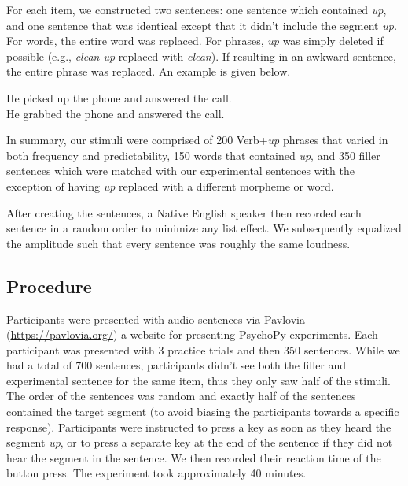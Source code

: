 \documentclass[
  man,floatsintext]{apa6}
\begin{document}
For each item, we constructed two sentences: one sentence which contained \emph{up}, and one sentence that was identical except that it didn't include the segment \emph{up.} For words, the entire word was replaced. For phrases, \emph{up} was simply deleted if possible (e.g., \emph{clean up} replaced with \emph{clean}). If resulting in an awkward sentence, the entire phrase was replaced. An example is given below.

\begin{exe} 
\ex
  \begin{xlist}
    \ex He picked up the phone and answered the call. \\
    \ex He grabbed the phone and answered the call. \\
  \end{xlist}
\end{exe}

In summary, our stimuli were comprised of 200 Verb+\emph{up} phrases that varied in both frequency and predictability, 150 words that contained \emph{up}, and 350 filler sentences which were matched with our experimental sentences with the exception of having \emph{up} replaced with a different morpheme or word.

After creating the sentences, a Native English speaker then recorded each sentence in a random order to minimize any list effect. We subsequently equalized the amplitude such that every sentence was roughly the same loudness.

\subsection{Procedure}\label{procedure}

Participants were presented with audio sentences via Pavlovia (\url{https://pavlovia.org/}) a website for presenting PsychoPy experiments. Each participant was presented with 3 practice trials and then 350 sentences. While we had a total of 700 sentences, participants didn't see both the filler and experimental sentence for the same item, thus they only saw half of the stimuli. The order of the sentences was random and exactly half of the sentences contained the target segment (to avoid biasing the participants towards a specific response). Participants were instructed to press a key as soon as they heard the segment \emph{up}, or to press a separate key at the end of the sentence if they did not hear the segment in the sentence. We then recorded their reaction time of the button press. The experiment took approximately 40 minutes.
\end{document}
